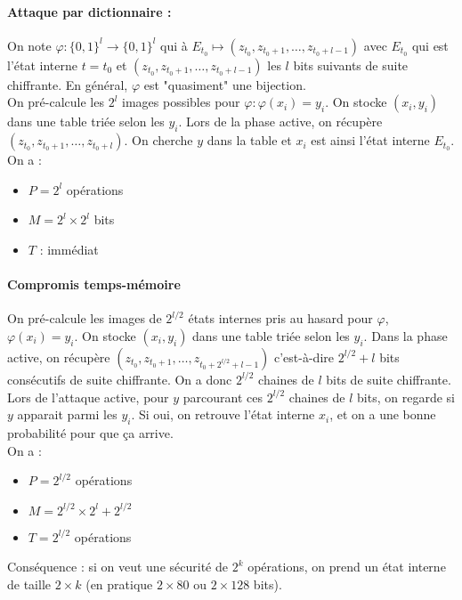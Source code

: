 \documentclass[12pt,a4paper]{report}
\begin{document}
\paragraph{Attaque par dictionnaire :\\}
On note $\varphi : \{0,1\}^l \longrightarrow \{0,1\}^l$ qui à $E_{t_0} \longmapsto (z_{t_0}, z_{t_0+1},\ldots, z_{t_0+l-1})$ avec $E_{t_0}$ qui est l'état interne  $t=t_0$ et $(z_{t_0}, z_{t_0+1},\ldots, z_{t_0+l-1})$ les $l$ bits suivants de suite chiffrante. En général, $\varphi$ est "quasiment" une bijection.\\
On pré-calcule les $2^l$ images possibles pour $\varphi : \varphi(x_i)=y_i$. On stocke $(x_i,y_i)$ dans une table triée selon les $y_i$.
Lors de la phase active, on récupère $(z_{t_0}, z_{t_0+1},\ldots, z_{t_0+l})$. On cherche $y$ dans la table et $x_i$ est ainsi l'état interne $E_{t_0}$.\\
On a : 
\begin{itemize}
\item $P= 2^l$ opérations
\item $M = 2^l\times 2^l$ bits
\item $T$ : immédiat
\end{itemize}
\paragraph{Compromis temps-mémoire\\}
On pré-calcule les images de $2^{l/2}$ états internes pris au hasard pour $\varphi$, $\varphi(x_i)=y_i$. On stocke $(x_i,y_i)$ dans une table triée selon les $y_i$. Dans la phase active, on récupère $(z_{t_0}, z_{t_0+1},\ldots, z_{t_0+2^{l/2}+l-1})$ c'est-à-dire $2^{l/2}+l$ bits consécutifs de suite chiffrante. On a donc $2^{l/2}$ chaines de $l$ bits de suite chiffrante. Lors de l'attaque active, pour $y$ parcourant ces $2^{l/2}$ chaines de $l$ bits, on regarde si $y$ apparait parmi les $y_i$. Si oui, on retrouve l'état interne $x_i$, et on a une bonne probabilité pour que ça arrive.\\
On a :
\begin{itemize}
\item $P=2^{l/2}$ opérations 
\item $M= 2^{l/2}\times 2^l + 2^{l/2} $
\item $T=2^{l/2}$ opérations
\end{itemize}
Conséquence : si on veut une sécurité de $2^k$ opérations, on prend un état interne de taille $2 \times k$ (en pratique $2\times 80$ ou $ 2 \times 128$ bits).
\end{document}

